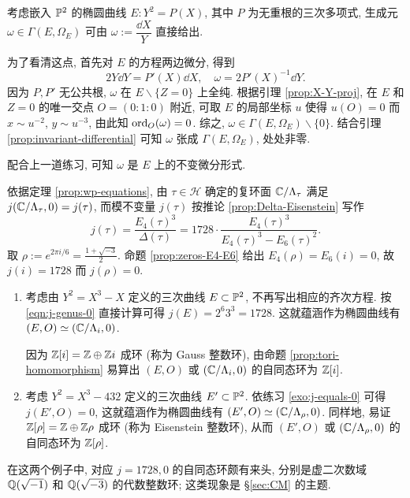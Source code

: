 \begin{example}\label{eg:invariant-differential}
	考虑嵌入 $\mathbb{P}^2$ 的椭圆曲线 $E: Y^2 = P(X)$, 其中 $P$ 为无重根的三次多项式, 生成元 $\omega \in \Gamma(E, \Omega_E)$ 可由 $\omega := \dfrac{\dd X}{Y}$ 直接给出.
	
	为了看清这点, 首先对 $E$ 的方程两边微分, 得到
	\[ 2Y \dd Y = P'(X) \dd X, \quad \omega = 2 P'(X)^{-1} \dd Y. \]
	因为 $P,P'$ 无公共根, $\omega$ 在 $E \smallsetminus \{Z=0\}$ 上全纯. 根据引理 \ref{prop:X-Y-proj}, 在 $E$ 和 $Z=0$ 的唯一交点 $O = (0:1:0)$ 附近, 可取 $E$ 的局部坐标 $u$ 使得 $u(O)=0$ 而 $x \sim u^{-2}$, $y \sim u^{-3}$, 由此知 $\operatorname*{ord}_O(\omega) = 0$. 综之, $\omega \in \Gamma(E, \Omega_E) \smallsetminus \{0\}$. 结合引理 \ref{prop:invariant-differential} 可知 $\omega$ 张成 $\Gamma(E, \Omega_E)$, 处处非零.
	
	配合上一道练习, 可知 $\omega$ 是 $E$ 上的不变微分形式.
\end{example}

\begin{example}\label{eg:j-computation}
	依据定理 \ref{prop:wp-equations}, 由 $\tau \in \mathcal{H}$ 确定的复环面 $\mathbb{C}/\Lambda_\tau$ 满足 $j(\mathbb{C}/\Lambda_\tau, 0) = j(\tau)$, 而模不变量 $j(\tau)$ 按推论 \ref{prop:Delta-Eisenstein} 写作
	\[ j(\tau) = \frac{E_4(\tau)^3}{\Delta(\tau)} = 1728 \cdot \frac{E_4(\tau)^3}{E_4(\tau)^3 - E_6(\tau)^2}. \]
	取 $\rho := e^{2\pi i/6} = \frac{1 + \sqrt{-3}}{2}$. 命题 \ref{prop:zeros-E4-E6} 给出 $E_4(\rho) = E_6(i) = 0$, 故 $j(i) = 1728$ 而 $j(\rho)=0$.
	\begin{enumerate}
		\item 考虑由 $Y^2 = X^3 - X$ 定义的三次曲线 $E \subset \mathbb{P}^2$, 不再写出相应的齐次方程. 按 \eqref{eqn:j-genus-0} 直接计算可得 $j(E) = 2^6 3^3 = 1728$. 这就蕴涵作为椭圆曲线有 $(E, O) \simeq (\mathbb{C}/\Lambda_i, 0)$.
		
		因为 $\mathbb{Z}[i] = \mathbb{Z} \oplus \mathbb{Z} i$ 成环 (称为 Gauss 整数环), 由命题 \ref{prop:tori-homomorphism} 易算出 $(E,O)$ 或 $(\mathbb{C}/\Lambda_i, 0)$ 的自同态环为 $\mathbb{Z}[i]$.
		\item 考虑 $Y^2 = X^3 - 432$ 定义的三次曲线 $E' \subset \mathbb{P}^2$. 依练习 \ref{exo:j-equals-0} 可得 $j(E', O) = 0$, 这就蕴涵作为椭圆曲线有 $(E', O) \simeq (\mathbb{C}/\Lambda_\rho, 0)$. 同样地, 易证 $\mathbb{Z}[\rho] = \mathbb{Z} \oplus \mathbb{Z}\rho$ 成环 (称为 Eisenstein 整数环), 从而 $(E', O)$ 或 $(\mathbb{C}/\Lambda_\rho, 0)$ 的自同态环为 $\mathbb{Z}[\rho]$.
	\end{enumerate}
	在这两个例子中, 对应 $j=1728, 0$ 的自同态环颇有来头, 分别是虚二次数域 $\mathbb{Q}(\sqrt{-1})$ 和 $\mathbb{Q}(\sqrt{-3})$ 的代数整数环; 这类现象是 \S\ref{sec:CM} 的主题.
\end{example}

